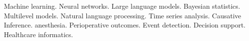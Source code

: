 

\begin{cvparagraph}

Machine learning. Neural networks. Large language models. Bayesian statistics. Multilevel models. Natural language processing. Time series analysis. Causative Inference. anesthesia. Perioperative outcomes. Event detection. Decision support. Healthcare informatics.
\end{cvparagraph}